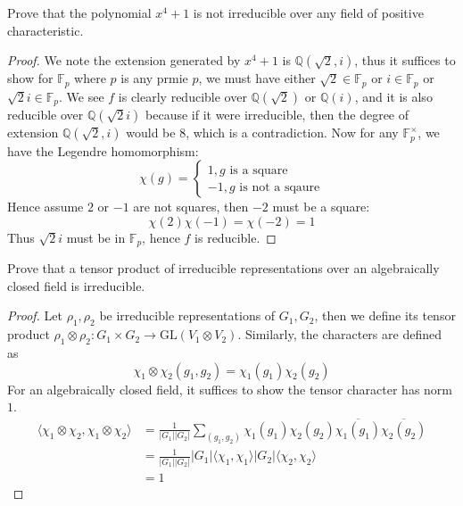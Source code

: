 \documentclass[openany]{book}
\newcommand{\F}{\mathbb{F}}
\newcommand{\la}{\langle}
\newcommand{\ra}{\rangle}
\newcommand{\Q}{\mathbb{Q}}
\begin{document}
\begin{prob}
    Prove that the polynomial \(x^{4}+1\) is not irreducible over any field of positive characteristic.
\end{prob}
\begin{proof}
    We note the extension generated by $x^4+1$ is $\Q(\sqrt{2},i)$, thus it suffices to show for $\F_p$ where $p$ is any prmie $p$, we must have either $\sqrt{2}\in\F_p$ or $i\in\F_p$ or $\sqrt{2}i\in\F_p$. We see $f$ is clearly reducible over $\Q(\sqrt{2})$ or $\Q(i)$, and it is also reducible over $\Q(\sqrt{2}i)$ because if it were irreducible, then the degree of extension $\Q(\sqrt{2}, i)$ would be $8$, which is a contradiction. Now for any $\F_p^\times$, we have the Legendre homomorphism:
    \begin{equation*}
        \chi(g)=\begin{cases}
            1, g \text{ is a square}\\
            -1, g \text{ is not a sqaure}
        \end{cases}
    \end{equation*}
    Hence assume $2$ or $-1$ are not squares, then $-2$ must be a square:
    \begin{equation*}
        \chi(2)\chi(-1)=\chi(-2)=1
    \end{equation*}
    Thus $\sqrt{2}i$ must be in $\F_p$, hence $f$ is reducible.
\end{proof}


\begin{prob}
    Prove that a tensor product of irreducible representations over an algebraically closed field is irreducible.
\end{prob}
\begin{proof}
    Let $\rho_1,\rho_2$ be irreducible representations of $G_1,G_2$, then we define its tensor product $\rho_1\otimes\rho_2:G_1\times G_2\to\text{GL}(V_1\otimes V_2)$. Similarly, the characters are defined as 
    \begin{equation*}
        \chi_1\otimes\chi_2(g_1,g_2)=\chi_1(g_1)\chi_2(g_2)
    \end{equation*}
    For an algebraically closed field, it suffices to show the tensor character has norm $1$. 
    \begin{align*}
        \la\chi_1\otimes\chi_2,\chi_1\otimes\chi_2\ra&=\frac{1}{|G_1||G_2|}\sum_{(g_1,g_2)}\chi_1(g_1)\chi_2(g_2)\overline{\chi_1(g_1)}\overline{\chi_2(g_2)}\\
        &=\frac{1}{|G_1||G_2|}|G_1|\la\chi_1,\chi_1\ra|G_2|\la\chi_2,\chi_2\ra\\
        &=1
    \end{align*}
\end{proof}
\end{document}
